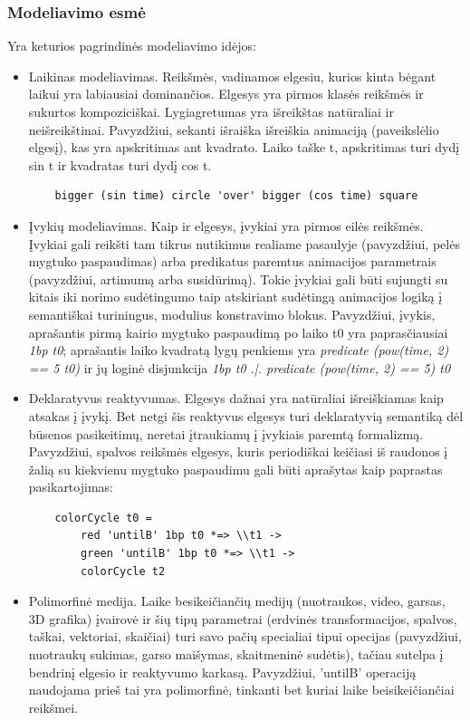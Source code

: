 \subsubsection{Modeliavimo esmė}

Yra keturios pagrindinės modeliavimo idėjos:

\begin{itemize}

	\item Laikinas modeliavimas. Reikšmės, vadinamos elgesiu, kurios kinta bėgant laikui yra labiausiai dominančios. Elgesys yra pirmos klasės reikšmės ir sukurtos kompoziciškai. Lygiagretumas yra išreikštas natūraliai ir neišreikštinai. Pavyzdžiui, sekanti išraiška išreiškia animaciją (paveikslėlio elgesį), kas yra apskritimas ant kvadrato. Laiko taške t, apskritimas turi dydį sin t ir kvadratas turi dydį cos t.

\begin{lstlisting}
	bigger (sin time) circle 'over' bigger (cos time) square
\end{lstlisting}

	\item Įvykių modeliavimas. Kaip ir elgesys, įvykiai yra pirmos eilės reikšmės. Įvykiai gali reikšti tam tikrus nutikimus realiame pasaulyje (pavyzdžiui, pelės mygtuko paspaudimas) arba predikatus paremtus animacijos parametrais (pavyzdžiui, artimumą arba susidūrimą). Tokie įvykiai gali būti sujungti su kitais iki norimo sudėtingumo taip atskiriant sudėtingą animacijos logiką į semantiškai turiningus, modulius konstravimo blokus. Pavyzdžiui, įvykis, aprašantis pirmą kairio mygtuko paspaudimą po laiko t0 yra paprasčiausiai \textit{1bp t0}; aprašantis laiko kvadratą lygų penkiems yra \textit{predicate (pow(time, 2) == 5 t0)} ir jų loginė disjunkcija \textit{1bp t0 .|. predicate (pow(time, 2) == 5) t0}

	\item Deklaratyvus reaktyvumas. Elgesys dažnai yra natūraliai išreiškiamas kaip atsakas į įvykį. Bet netgi šis reaktyvus elgesys turi deklaratyvią semantiką dėl būsenos pasikeitimų, neretai įtraukiamų į įvykiais paremtą formalizmą. Pavyzdžiui, spalvos reikšmės elgesys, kuris periodiškai keičiasi iš raudonos į žalią su kiekvienu mygtuko paspaudimu gali būti aprašytas kaip paprastas pasikartojimas:

\begin{lstlisting}
	colorCycle t0 =
		red 'untilB' 1bp t0 *=> \\t1 ->
		green 'untilB' 1bp t0 *=> \\t1 ->
		colorCycle t2
\end{lstlisting}

	\item Polimorfinė medija. Laike besikeičiančių medijų (nuotraukos, video, garsas, 3D grafika) įvairovė ir šių tipų parametrai (erdvinės transformacijos, spalvos, taškai, vektoriai, skaičiai) turi savo pačių specialiai tipui opecijas (pavyzdžiui, nuotraukų sukimas, garso maišymas, skaitmeninė sudėtis), tačiau sutelpa į bendrinį elgesio ir reaktyvumo karkasą. Pavyzdžiui, 'untilB' operaciją naudojama prieš tai yra polimorfinė, tinkanti bet kuriai laike beisikeičiančiai reikšmei.

\end{itemize}

